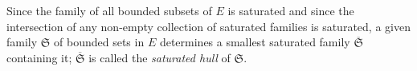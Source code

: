 Since the family of all bounded subsets of \(E\) is saturated and since the intersection of any non-empty collection of saturated families is saturated, a given family \(\mathfrak{S}\) of bounded sets in \(E\) determines a smallest saturated family \(\overline{\mathfrak{S}}\) containing it; \(\overline{\mathfrak{S}}\) is called the \textit{saturated hull} of \(\mathfrak{S}\).
